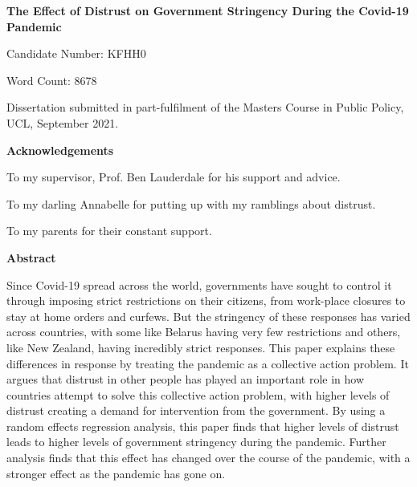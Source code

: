 \documentclass[
  12pt,
]{article}
\author{}
\date{\vspace{-2.5em}}
\begin{document}
\begin{titlepage}
\begin{center}
\vspace*{5cm}
\LARGE
\textbf{The Effect of Distrust on Government Stringency During the Covid-19 Pandemic}


\vspace{1.5cm}
\large
Candidate Number: KFHH0

\vspace{0.5cm}
Word Count: 8678

\vfill

Dissertation submitted in part-fulfilment of the Masters Course in Public Policy, UCL,  September 2021.

\end{center}
\end{titlepage}

\begin{center}
\textbf{Acknowledgements}

To my supervisor, Prof. Ben Lauderdale for his support and advice.

To my darling Annabelle for putting up with my ramblings about distrust.

To my parents for their constant support.
\end{center}

\pagebreak

\begin{center}
\vspace*{5cm}
\textbf{Abstract}
\end{center}
Since Covid-19 spread across the world, governments have sought to control it through imposing strict restrictions on their citizens, from work-place closures to stay at home orders and curfews. But the stringency of these responses has varied across countries, with some like Belarus having very few restrictions and others, like New Zealand, having incredibly strict responses. This paper explains these differences in response by treating the pandemic as a collective action problem. It argues that distrust in other people has played an important role in how countries attempt to solve this collective action problem, with higher levels of distrust creating a demand for intervention from the government. By using a random effects regression analysis, this paper finds that higher levels of distrust leads to higher levels of government stringency during the pandemic. Further analysis finds that this effect has changed over the course of the pandemic, with a stronger effect as the pandemic has gone on.
\pagebreak
\end{document}
